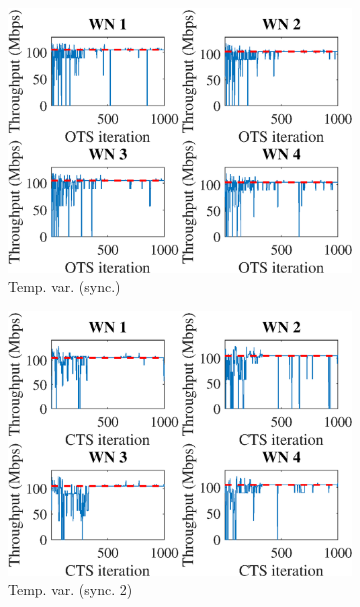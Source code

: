 \documentclass[preprint,12pt]{article}
\begin{document}
\begin{figure}[h!]
\begin{subfigure}[b]{.3\textwidth}
		\includegraphics[width=\textwidth]{images/temporal_individual_tpt_OTS}
		\caption{Temp. var.  (sync.)}\label{fig:temporal_individual_tpt_OTS}
	\end{subfigure}
	\begin{subfigure}[b]{.3\textwidth}
		\includegraphics[width=\textwidth]{images/temporal_individual_tpt_CTS}
		\caption{Temp. var.  (sync. 2)}\label{fig:temporal_individual_tpt_CTS}
	\end{subfigure}\\
	\begin{subfigure}[b]{.3\textwidth}

\end{subfigure}
\end{figure}
\end{document}
